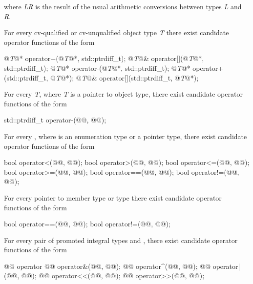 where
\textit{LR}
is the result of the usual arithmetic conversions between types
\textit{L}
and
\textit{R}.

\pnum
For every cv-qualified or cv-unqualified object type
\textit{T}
there exist candidate operator functions of the form

\begin{codeblock}
@\textit{T}@*      operator+(@\textit{T}@*, std::ptrdiff_t);
@\textit{T}@&      operator[](@\textit{T}@*, std::ptrdiff_t);
@\textit{T}@*      operator-(@\textit{T}@*, std::ptrdiff_t);
@\textit{T}@*      operator+(std::ptrdiff_t, @\textit{T}@*);
@\textit{T}@&      operator[](std::ptrdiff_t, @\textit{T}@*);
\end{codeblock}

\pnum
For every
\textit{T},
where
\textit{T}
is a pointer to object type,
there exist candidate operator functions of the form

\begin{codeblock}
std::ptrdiff_t   operator-(@@, @@);
\end{codeblock}

\pnum
For every , where  is an enumeration type or a pointer type,
there exist candidate operator functions of the form

\begin{codeblock}
bool    operator<(@@, @@);
bool    operator>(@@, @@);
bool    operator<=(@@, @@);
bool    operator>=(@@, @@);
bool    operator==(@@, @@);
bool    operator!=(@@, @@);
\end{codeblock}

\pnum
For every pointer to member type  or type  there
exist candidate operator functions of the form

\begin{codeblock}
bool    operator==(@@, @@);
bool    operator!=(@@, @@);
\end{codeblock}

\pnum
For every pair of promoted integral types
and
,
there exist candidate operator functions of the form

\begin{codeblock}
@@      operator%
@@      operator&(@@, @@);
@@      operator^(@@, @@);
@@      operator|(@@, @@);
@@       operator<<(@@, @@);
@@       operator>>(@@, @@);
\end{codeblock}

